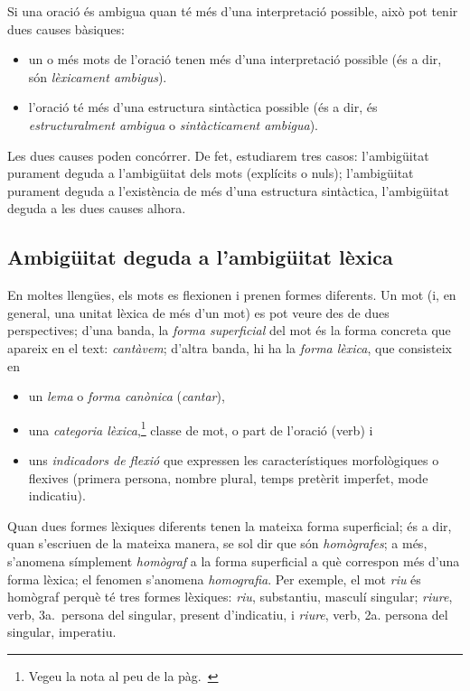 Si una oració és ambigua quan té més d'una interpretació possible, això
pot tenir dues causes bàsiques:
\begin{itemize}
\item un o més mots de l'oració tenen més d'una interpretació possible
  (és a dir, són \emph{lèxicament ambigus}).
\item l'oració té més d'una estructura sintàctica possible (és a dir,
  és \emph{estructuralment ambigua} o \emph{sintàcticament ambigua}).
\end{itemize}
Les dues causes poden concórrer. De fet, estudiarem tres casos:
l'ambigüitat purament deguda a l'ambigüitat dels mots (explícits o
nuls); l'ambigüitat purament deguda a l'existència de més d'una
estructura sintàctica, l'ambigüitat deguda a les dues causes alhora.


\subsection{Ambigüitat  deguda a l'ambigüitat lèxica}
\label{ss:amblex}


En moltes llengües, els mots es flexionen i prenen formes diferents.
Un mot (i, en general, una unitat lèxica de més d'un mot) es pot veure
des de dues perspectives; d'una banda, la \emph{forma superficial}
del mot és la forma concreta que apareix en el text: \emph{cantàvem};
d'altra banda, hi ha la \emph{forma lèxica}, que consisteix en
\begin{itemize}
\item un \emph{lema} o \emph{forma canònica} (\emph{cantar}), 
\item una \emph{categoria lèxica},\label{pg:catlex}\footnote{Vegeu la nota al peu  de la pàg.~\pageref{pg:catgra}} classe de mot, o part de l'oració
  (verb) i 
\item uns \emph{indicadors de flexió} que expressen les característiques
morfològiques o flexives (primera persona, nombre plural, temps
pretèrit imperfet, mode indicatiu). 
\end{itemize}
Quan dues formes lèxiques diferents tenen la mateixa forma
superficial; és a dir, quan s'escriuen de la mateixa manera, se sol dir que
són \emph{homògrafes}\label{pg:homografia}; a més, s'anomena símplement \emph{homògraf} a
la forma superficial a què correspon més d'una forma lèxica; el
fenomen s'anomena \emph{homografia}. Per exemple, el mot \emph{riu} és
homògraf perquè té tres formes lèxiques: \emph{riu}, substantiu,
masculí singular; \emph{riure}, verb, 3a.\ persona del singular,
present d'indicatiu, i \emph{riure}, verb, 2a. persona del singular,
imperatiu.

